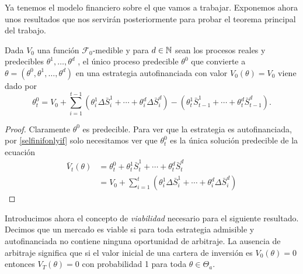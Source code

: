 Ya tenemos el modelo financiero sobre el que vamos a trabajar. Exponemos ahora unos resultados que nos servirán posteriormente para probar el teorema principal del trabajo.

\begin{lemaBox}\label{2.2.1}
	Dada $ V_0 $ una función $ \mathcal{F}_0 $-medible y para $ d \in \mathbb{N}  $ sean los procesos reales y predecibles $ \theta^1,\dots,\theta^d $ , el único proceso predecible $ \theta^0 $ que convierte a $ \theta = (\theta^0,\theta^1,\dots,\theta^d) $ en una estrategia autofinanciada con valor $ V_0 (\theta)= V_0 $ viene dado por
	\[
	\theta^0_t = V_0 + \sum_{i=1}^{t-1}(\theta^1_i\Delta\bar{S}^1_i+\cdots+\theta^d_i\Delta\bar{S}^d_i) - (\theta^1_t\bar{S}^1_{t-1}+\cdots+\theta^d_t\bar{S}^d_{t-1}).
	\]
\end{lemaBox}
\begin{proof}
	Claramente $ \theta^0 $ es predecible. Para ver que la estrategia es autofinanciada, por \eqref{selfinifonlyif} solo necesitamos ver que $ \theta^0_t $ es la única solución predecible de la ecuación 
	\begin{equation*}
	\begin{split}
	\bar{V}_t(\theta) &= \theta^0_t + \theta^1_t\bar{S}^1_t+\cdots+\theta^d_t\bar{S}^d_t \\
	&= V_0 + \sum_{i=1}^{t}(\theta^1_i\Delta\bar{S}^1_i+\cdots+\theta^d_i\Delta\bar{S}^d_i)
	\end{split}
	\end{equation*}
\end{proof}

Introducimos ahora el concepto de \textit{viabilidad} necesario para el siguiente resultado. Decimos que un mercado es viable si para toda estrategia admisible y autofinanciada no contiene ninguna oportunidad de arbitraje. La ausencia de arbitraje significa que si el valor inicial de una cartera de inversión es $ V_0(\theta) = 0 $ entonces $ V_T(\theta) = 0 $ con probabilidad 1 para toda $ \theta \in\Theta_a $. 

